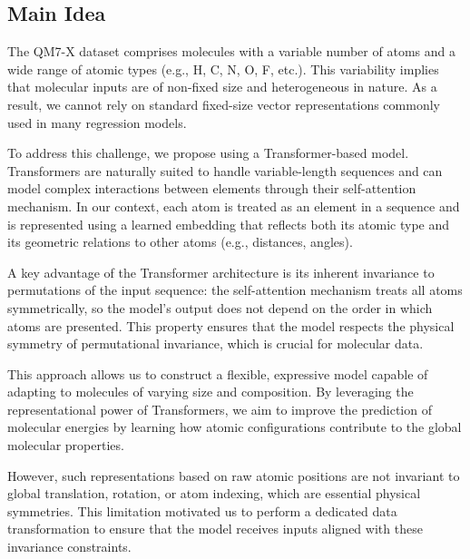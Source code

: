\documentclass{article}
\begin{document}
\subsection{Main Idea}

The QM7-X dataset comprises molecules with a variable number of atoms and a wide range of atomic types (e.g., H, C, N, O, F, etc.). This variability implies that molecular inputs are of non-fixed size and heterogeneous in nature. As a result, we cannot rely on standard fixed-size vector representations commonly used in many regression models. \newline

To address this challenge, we propose using a Transformer-based model. Transformers are naturally suited to handle variable-length sequences and can model complex interactions between elements through their self-attention mechanism. In our context, each atom is treated as an element in a sequence and is represented using a learned embedding that reflects both its atomic type and its geometric relations to other atoms (e.g., distances, angles). \newline

A key advantage of the Transformer architecture is its inherent invariance to permutations of the input sequence: the self-attention mechanism treats all atoms symmetrically, so the model's output does not depend on the order in which atoms are presented. This property ensures that the model respects the physical symmetry of permutational invariance, which is crucial for molecular data. \newline

This approach allows us to construct a flexible, expressive model capable of adapting to molecules of varying size and composition. By leveraging the representational power of Transformers, we aim to improve the prediction of molecular energies by learning how atomic configurations contribute to the global molecular properties. \newline

However, such representations based on raw atomic positions are not invariant to global translation, rotation, or atom indexing, which are essential physical symmetries. This limitation motivated us to perform a dedicated data transformation to ensure that the model receives inputs aligned with these invariance constraints.
\end{document}
